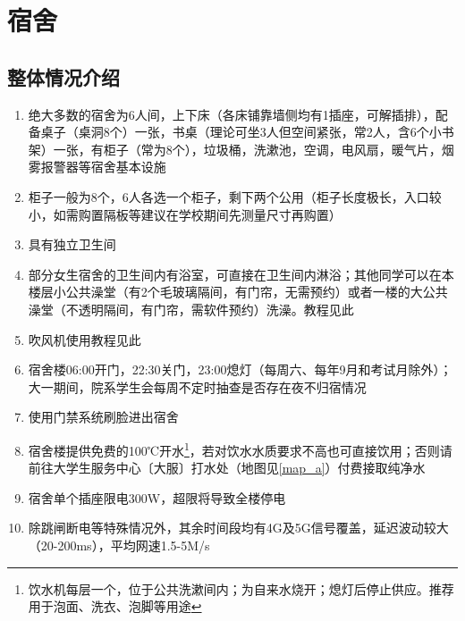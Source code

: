 \chapter[宿舍]{宿舍}
\section[整体情况介绍]{整体情况介绍}
\begin{enumerate}
    \item 绝大多数的宿舍为6人间，上下床（各床铺靠墙侧均有1插座，可解插排），配备桌子（桌洞8个）一张，书桌（理论可坐3人但空间紧张，常2人，含6个小书架）一张，有柜子（常为8个），垃圾桶，洗漱池，空调，电风扇，暖气片，烟雾报警器等宿舍基本设施
    \item 柜子一般为8个，6人各选一个柜子，剩下两个公用（柜子长度极长，入口较小，如需购置隔板等建议在学校期间先测量尺寸再购置）
    \item 具有独立卫生间
    \item 部分女生宿舍的卫生间内有浴室，可直接在卫生间内淋浴；其他同学可以在本楼层小公共澡堂（有2个毛玻璃隔间，有门帘，无需预约）或者一楼的大公共澡堂（不透明隔间，有门帘，需软件预约）洗澡。教程见此
    \item 吹风机使用教程见此
    \item 宿舍楼06:00开门，22:30关门，23:00熄灯（每周六、每年9月和考试月除外）；大一期间，院系学生会每周不定时抽查是否存在夜不归宿情况
    \item 使用门禁系统刷脸进出宿舍
    \item 宿舍楼提供免费的100℃开水\footnote{饮水机每层一个，位于公共洗漱间内；为自来水烧开；熄灯后停止供应。推荐用于泡面、洗衣、泡脚等用途}，若对饮水水质要求不高也可直接饮用；否则请前往大学生服务中心〔大服〕打水处（地图见\uline{\ref{map_a}}）付费接取纯净水
    \item 宿舍单个插座限电300W，超限将导致全楼停电
    \item 除跳闸断电等特殊情况外，其余时间段均有4G及5G信号覆盖，延迟波动较大（20-200ms），平均网速1.5-5M/s
\end{enumerate}

